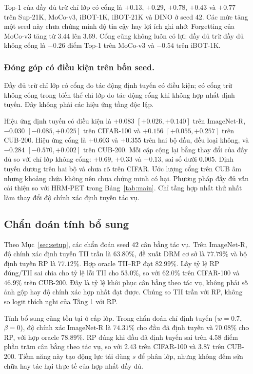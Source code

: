 \documentclass[runningheads]{llncs}
\begin{document}
Top-1 của đầy đủ trừ chỉ lớp có cổng là $+0.13$, $+0.29$, $+0.78$, $+0.43$ và
$+0.77$ trên Sup-21K, MoCo-v3, iBOT-1K, iBOT-21K và DINO ở seed $42$. Các mức
tăng một seed này chưa chứng minh độ tin cậy hay lợi ích ghi nhớ: Forgetting
của MoCo-v3 tăng từ $3.44$ lên $3.69$. Cổng cũng không luôn có lợi: đầy đủ trừ
đầy đủ không cổng là $-0.26$ điểm Top-1 trên MoCo-v3 và $-0.54$ trên iBOT-1K.

\subsubsection{Đóng góp có điều kiện trên bốn seed.}
Đầy đủ trừ chỉ lớp có cổng đo tác động định tuyến có điều kiện; có cổng trừ
không cổng trong biến thể chỉ lớp đo tác động cổng khi không hợp nhất định
tuyến. Đây không phải các hiệu ứng tầng độc lập.

Hiệu ứng định tuyến có điều kiện là $+0.083$ $[+0.026,+0.140]$ trên ImageNet-R,
$-0.030$ $[-0.085,+0.025]$ trên CIFAR-100 và $+0.156$ $[+0.055,+0.257]$ trên
CUB-200. Hiệu ứng cổng là $+0.603$ và $+0.355$ trên hai bộ đầu, đều loại không,
và $-0.284$ $[-0.570,+0.002]$ trên CUB-200. Mỗi cặp cộng lại bằng thay đổi của
đầy đủ so với chỉ lớp không cổng: $+0.69$, $+0.33$ và $-0.13$, sai số dưới
$0.005$. Định tuyến dương trên hai bộ và chưa rõ trên CIFAR. Ước lượng cổng
trên CUB âm nhưng khoảng chứa không nên chưa chứng minh có hại. Phương pháp
đầy đủ vẫn cải thiện so với HRM-PET trong Bảng~\ref{tab:main}. Chỉ tầng hợp
nhất thứ nhất làm thay đổi độ chính xác định tuyến tác vụ.

\subsection{Chẩn đoán tính bổ sung}
\label{sec:diagnostics}

Theo Mục~\ref{sec:setup}, các chẩn đoán seed $42$ cân bằng tác vụ.
Trên ImageNet-R, độ chính xác định tuyến TII trần là $63.80\%$, đề xuất DRM cơ
sở là $77.79\%$ và bộ định tuyến RP là $77.12\%$. Hợp oracle TII--RP đạt
$82.99\%$. Lấy tỷ lệ RP đúng/TII sai chia cho tỷ lệ lỗi TII cho $53.0\%$, so
với $62.0\%$ trên CIFAR-100 và $46.9\%$ trên CUB-200. Đây là tỷ lệ khôi phục
cân bằng theo tác vụ, không phải số ảnh gộp hay độ chính xác hợp nhất đạt được.
Chúng so TII trần với RP, không so logit thích nghi của Tầng 1 với RP.

Tính bổ sung cũng tồn tại ở cấp lớp. Trong chẩn đoán chỉ định tuyến
($w=0.7$, $\beta=0$), độ chính xác ImageNet-R là $74.31\%$ cho đầu đã định
tuyến và $70.08\%$ cho RP, với hợp oracle $78.89\%$. RP đúng khi đầu đã định
tuyến sai trên $4.58$ điểm phần trăm cân bằng theo tác vụ, so với $2.43$ trên
CIFAR-100 và $3.87$ trên CUB-200. Tiềm năng này tạo động lực tái dùng $s$ để
phân lớp, nhưng không đếm sửa chữa hay tác hại thực tế của hợp nhất đầy đủ.
\end{document}
